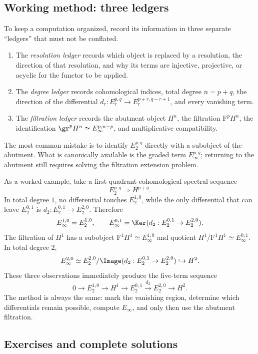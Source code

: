 \subsection*{Working method: three ledgers}

To keep a computation organized, record its information in three separate
``ledgers'' that must not be conflated.
\begin{enumerate}
	\item The \emph{resolution ledger} records which object is replaced by a
	resolution, the direction of that resolution, and why its terms are
	injective, projective, or acyclic for the functor to be applied.
	\item The \emph{degree ledger} records cohomological indices, total degree
	$n=p+q$, the direction of the differential
	$d_r:E_r^{p,q}\to E_r^{p+r,q-r+1}$, and every vanishing term.
	\item The \emph{filtration ledger} records the abutment object $H^n$, the
	filtration $\mathrm{F}^pH^n$, the identification
	$\gr^pH^n\simeq E_\infty^{p,n-p}$, and multiplicative compatibility.
\end{enumerate}
The most common mistake is to identify $E_2^{p,q}$ directly with a subobject
of the abutment. What is canonically available is the graded term
$E_\infty^{p,q}$; returning to the abutment still requires solving the
filtration extension problem.

As a worked example, take a first-quadrant cohomological spectral sequence
\[
	E_2^{p,q}\Rightarrow H^{p+q}.
\]
In total degree $1$, no differential touches $E_2^{1,0}$, while the only
differential that can leave $E_2^{0,1}$ is
$d_2:E_2^{0,1}\to E_2^{2,0}$. Therefore
\[
	E_\infty^{1,0}=E_2^{1,0},\qquad
	E_\infty^{0,1}=\Ker(d_2:E_2^{0,1}\to E_2^{2,0}).
\]
The filtration of $H^1$ has a subobject
$\mathrm{F}^1H^1\simeq E_\infty^{1,0}$ and quotient
$H^1/\mathrm{F}^1H^1\simeq E_\infty^{0,1}$. In total degree $2$,
\[
	E_\infty^{2,0}\simeq
	E_2^{2,0}/\Image(d_2:E_2^{0,1}\to E_2^{2,0})
	\hookrightarrow H^2.
\]
These three observations immediately produce the five-term sequence
\[
	0\to E_2^{1,0}\to H^1\to E_2^{0,1}
	\xrightarrow{d_2}E_2^{2,0}\to H^2.
\]
The method is always the same: mark the vanishing region, determine which
differentials remain possible, compute $E_\infty$, and only then use the
abutment filtration.

\subsection*{Exercises and complete solutions}

